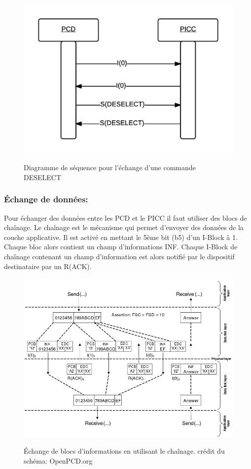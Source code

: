 \documentclass{themeensg}
\begin{document}
\begin{figure}[h!]
\centering
\includegraphics[scale=0.9]{images/deselect.png}
\label{fig:deselect}
\caption{Diagramme de séquence pour l'échange d'une commande DESELECT}
\end{figure}

\subsubsection{Échange de données:}
Pour échanger des données entre les PCD et le PICC il faut utiliser des blocs de chaînage. Le chaînage est le mécanisme qui permet d'envoyer des données de la couche applicative. Il est activé en mettant le 5ème bit (b5) d'un I-Block à 1. Chaque bloc alors contient un champ d'informations INF. Chaque I-Block de chaînage contenant un champ d'information est alors notifié par le dispositif destinataire par un R(ACK).

\begin{figure}[h!]
\centering
\includegraphics[scale=0.5]{images/chaining.png}
\label{fig:chaining}
\caption{Échange de blocs d'informations en utilisant le chaînage. crédit du schéma: OpenPCD.org}
\end{figure}
\end{document}
